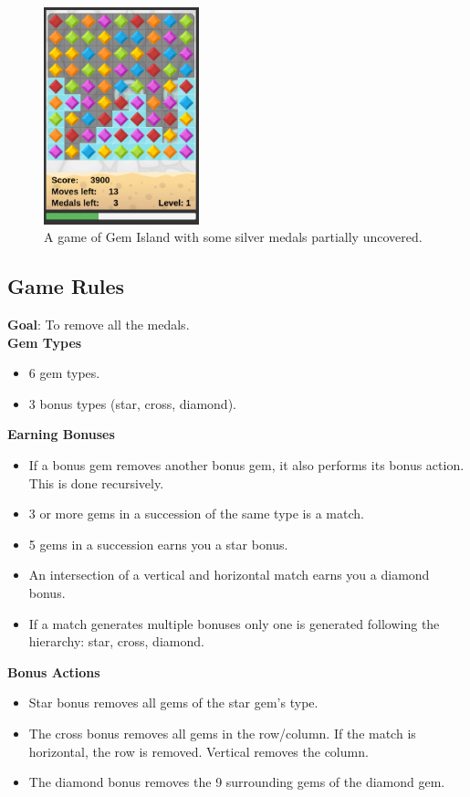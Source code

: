 \documentclass{bhamthesis}
\theoremstyle{definition}
\begin{document}
 \begin{figure}
	\centering
	\includegraphics[width=0.4\textwidth]{media/img/screen3Medals}
	\caption{A game of Gem Island with some silver medals partially uncovered.}\label{f:gameUncoveredMedals}
\end{figure}

\subsection{Game Rules}
\textbf{Goal}: To remove all the medals.\\
\noindent\textbf{Gem Types}
\begin{itemize}
	\item 6 gem types.
	\item 3 bonus types (star, cross, diamond).
\end{itemize}
\textbf{Earning Bonuses}
\begin{itemize}
	\item If a bonus gem removes another bonus gem, it also performs its bonus action. This is done recursively.
	\item 3 or more gems in a succession of the same type is a match.
	\item 5 gems in a succession earns you a star bonus.
	\item An intersection of a vertical and horizontal match earns you a diamond bonus.
	\item If a match generates multiple bonuses only one is generated following the hierarchy: star, cross, diamond.
\end{itemize}
\textbf{Bonus Actions}
\begin{itemize}
	\item Star bonus removes all gems of the star gem's type.
	\item The cross bonus removes all gems in the row/column. If the match is horizontal, the row is removed. Vertical removes the column.
	\item The diamond bonus removes the 9 surrounding gems of the diamond gem.
\end{itemize}
\end{document}
